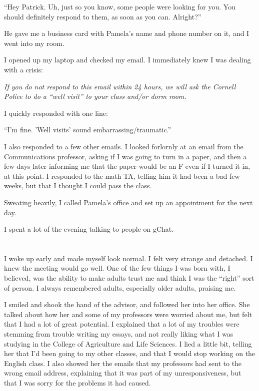 ``Hey Patrick.  Uh, just so you know, some people were looking for you.  You
should definitely respond to them, as soon as you can.  Alright?''

He gave me a business card with Pamela's name and phone number on it, and I went
into my room.

I opened up my laptop and checked my email.  I immediately knew I was dealing
with a crisis: 

\textit{If you do not respond to this email within 24 hours, we will ask
the Cornell Police to do a ``well visit'' to your class and/or dorm room.}

I quickly responded with one line:

``I'm fine.  'Well visits' sound embarrassing/traumatic.'' 

I also responded to a few other emails.  I looked forlornly at an email from the
Communications professor, asking if I was going to turn in a paper, and then
a few days later informing me that the paper would be an F even if I turned it
in, at this point.  I responded to the math TA, telling him it had been a bad
few weeks, but that I thought I could pass the class.

Sweating heavily, I called Pamela's office and set up an appointment for the
next day. 

I spent a lot of the evening talking to people on gChat.

\section{}

I woke up early and made myself look normal.  I felt very strange and detached.
I knew the meeting would go well.  One of the few things I was born with, I
believed, was the ability to make adults trust me and think I was the ``right''
sort of person.  I always remembered adults, especially older adults, praising
me.

I smiled and shook the hand of the advisor, and followed her into her office.
She talked about how her and some of my professors were worried about me, but
felt that I had a lot of great potential.  I explained that a lot of my troubles
were stemming from trouble writing my essays, and not really liking what I was
studying in the College of Agriculture and Life Sciences.  I lied a little bit,
telling her that I'd been going to my other classes, and that I would stop
working on the English class.  I also showed her the emails that my professors
had sent to the wrong email address, explaining that it was part of my
unresponsiveness, but that I was sorry for the problems it had caused.

